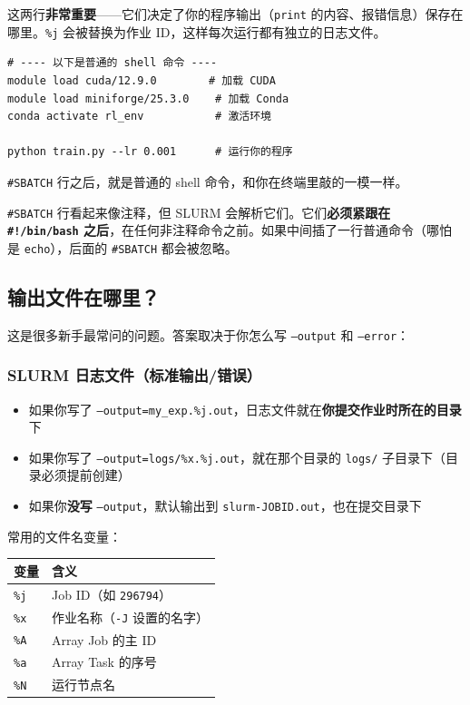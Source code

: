这两行\textbf{非常重要}——它们决定了你的程序输出（\texttt{print} 的内容、报错信息）保存在哪里。\texttt{\%j} 会被替换为作业 ID，这样每次运行都有独立的日志文件。

\begin{lstlisting}[language=slurm]
# ---- 以下是普通的 shell 命令 ----
module load cuda/12.9.0        # 加载 CUDA
module load miniforge/25.3.0    # 加载 Conda
conda activate rl_env           # 激活环境

python train.py --lr 0.001      # 运行你的程序
\end{lstlisting}

\texttt{\#SBATCH} 行之后，就是普通的 shell 命令，和你在终端里敲的一模一样。

\begin{warnbox}
\texttt{\#SBATCH} 行看起来像注释，但 SLURM 会解析它们。它们\textbf{必须紧跟在 \texttt{\#!/bin/bash} 之后}，在任何非注释命令之前。如果中间插了一行普通命令（哪怕是 \texttt{echo}），后面的 \texttt{\#SBATCH} 都会被忽略。
\end{warnbox}

\subsection{输出文件在哪里？}

这是很多新手最常问的问题。答案取决于你怎么写 \texttt{--output} 和 \texttt{--error}：

\subsubsection{SLURM 日志文件（标准输出/错误）}

\begin{itemize}
  \item 如果你写了 \texttt{--output=my\_exp.\%j.out}，日志文件就在\textbf{你提交作业时所在的目录}下
  \item 如果你写了 \texttt{--output=logs/\%x.\%j.out}，就在那个目录的 \texttt{logs/} 子目录下（目录必须提前创建）
  \item 如果你\textbf{没写} \texttt{--output}，默认输出到 \texttt{slurm-JOBID.out}，也在提交目录下
\end{itemize}

常用的文件名变量：

\begin{table}[h]
\centering
\begin{tabular}{ll}
\toprule
变量 & 含义 \\
\midrule
\texttt{\%j} & Job ID（如 \texttt{296794}） \\
\texttt{\%x} & 作业名称（\texttt{-J} 设置的名字） \\
\texttt{\%A} & Array Job 的主 ID \\
\texttt{\%a} & Array Task 的序号 \\
\texttt{\%N} & 运行节点名 \\
\bottomrule
\end{tabular}
\end{table}

